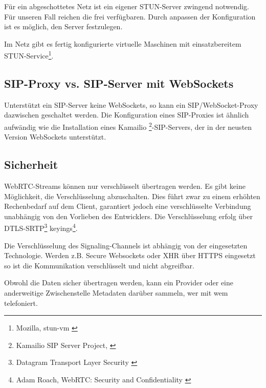 		Für ein abgeschottetes Netz ist ein eigener STUN-Server zwingend notwendig.
		Für unseren Fall reichen die frei verfügbaren. Durch anpassen der
		Konfiguration ist es möglich, den Server festzulegen.

		Im Netz gibt es fertig konfigurierte virtuelle Maschinen mit einsatzbereitem
		STUN-Service\footnote{Mozilla, stun-vm \cite{Mozilla-STUN-VM}}.
		
			\subsection{SIP-Proxy vs. SIP-Server mit WebSockets}
		Unterstützt ein SIP-Server keine WebSockets, so kann ein SIP/WebSocket-Proxy
		dazwischen geschaltet werden. Die Konfiguration eines SIP-Proxies ist ähnlich
		aufwändig wie die Installation eines Kamailio
		\footnote{Kamailio SIP Server Project, \cite{Kamailio-Project}}-SIP-Servers, der in der neusten Version WebSockets unterstützt.

	\subsection{Sicherheit}
		WebRTC-Streams können nur verschlüsselt übertragen werden. Es gibt keine
		Möglichkeit, die Verschlüsselung abzuschalten. Dies führt zwar zu einem
		erhöhten Rechenbedarf auf dem Client, garantiert jedoch eine verschlüsselte
		Verbindung unabhängig von den Vorlieben des Entwicklers.
		Die Verschlüsselung erfolg über DTLS-SRTP\footnote{Datagram Transport Layer Security \cite{IETF-DTLS-RFC}} 
		keyings\footnote{Adam Roach, WebRTC: Security and Confidentiality \cite{AdamRoach-WebRTC-Security}}. 
		
		Die Verschlüsselung des Signaling-Channels ist abhängig von der eingesetzten
		Technologie. Werden z.B. Secure Websockets oder XHR über HTTPS eingesetzt so ist die Kommunikation verschlüsselt und nicht abgreifbar.
		
		Obwohl die Daten sicher übertragen werden, kann ein Provider oder eine anderweitige Zwischenstelle Metadaten darüber sammeln, wer mit wem telefoniert.
		
		